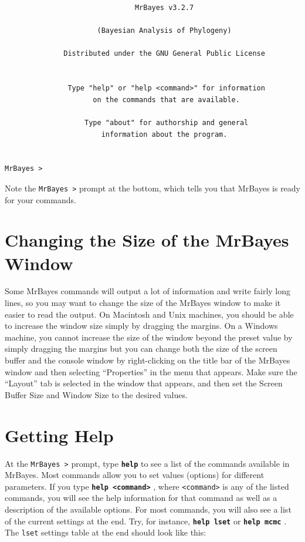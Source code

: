 \documentclass[12pt]{book}
\newcommand{\ttt}[1]{\texttt{#1} }
\newcommand{\tb}[1]{\texttt{\textbf{#1}} }
\begin{document}
\begin{singlespacing}
\small
\begin{verbatim}
                               MrBayes v3.2.7

                      (Bayesian Analysis of Phylogeny)

              Distributed under the GNU General Public License


               Type "help" or "help <command>" for information
                     on the commands that are available.

                   Type "about" for authorship and general
                       information about the program.


MrBayes >
\end{verbatim}
\normalsize
\end{singlespacing}

Note the \ttt{MrBayes >} prompt at the bottom, which tells you that MrBayes is ready for your
commands.

\section{Changing the Size of the MrBayes Window}

Some MrBayes commands will output a lot of information and write fairly long lines, so you may want
to change the size of the MrBayes window to make it easier to read the output. On Macintosh and
Unix machines, you should be able to increase the window size simply by dragging the margins. On a
Windows machine, you cannot increase the size of the window beyond the preset value by simply
dragging the margins but you can change both the size of the screen buffer and the console window
by right-clicking on the title bar of the MrBayes window and then selecting ``Properties'' in the
menu that appears. Make sure the ``Layout'' tab is selected in the window that appears, and then
set the Screen Buffer Size and Window Size to the desired values.

\section{Getting Help}
\label{gettingHelp}

At the \ttt{MrBayes >} prompt, type \tb{help} to see a list of the commands available in MrBayes.
Most commands allow you to set values (options) for different parameters. If you type \tb{help
<command>}, where \ttt{<command>} is any of the listed commands, you will see the help information
for that command as well as a description of the available options. For most commands, you will
also see a list of the current settings at the end.  Try, for instance, \tb{help lset} or \tb{help
mcmc}. The \ttt{lset} settings table at the end should look like this:
\end{document}

